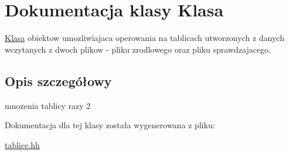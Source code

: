 \hypertarget{class_klasa}{\section{Dokumentacja klasy Klasa}
\label{class_klasa}
}


\hyperlink{class_klasa}{Klasa} obiektow umozliwiajaca operowania na tablicach utworzonych z danych wczytanych z dwoch plikow -\/ pliku zrodlowego oraz pliku sprawdzajacego.  




\subsection{Opis szczegółowy}
mnozenia tablicy razy 2 

Dokumentacja dla tej klasy została wygenerowana z pliku\-:\begin{DoxyCompactItemize}
\item 
\hyperlink{tablice_8hh}{tablice.\-hh}\end{DoxyCompactItemize}
